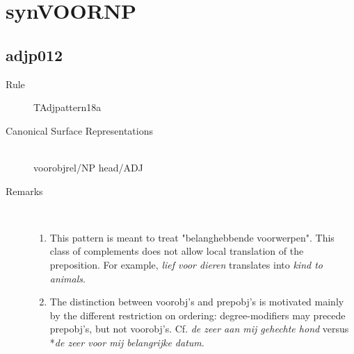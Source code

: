 \section{synVOORNP}
  \subsection{adjp012}
\begin{description}
  \item [Rule] TAdjpattern18a
  \item [Canonical Surface Representations]\mbox{}\\  voorobjrel/NP head/ADJ
  \item [Remarks] \mbox{}\\
\begin{enumerate}
  \item 
This pattern is meant to treat "belanghebbende voorwerpen".
This class of complements does not allow local translation of the preposition.
For example, {\em lief voor dieren} translates into {\em kind to animals}. 
  \item 
The distinction between voorobj's and prepobj's is motivated mainly by the 
different restriction on ordering: degree-modifiers may precede prepobj's, but 
not voorobj's. Cf. {\em de zeer aan mij gehechte hond} versus 
*{\em de zeer voor mij belangrijke datum}.


\end{enumerate}
\end{description}

